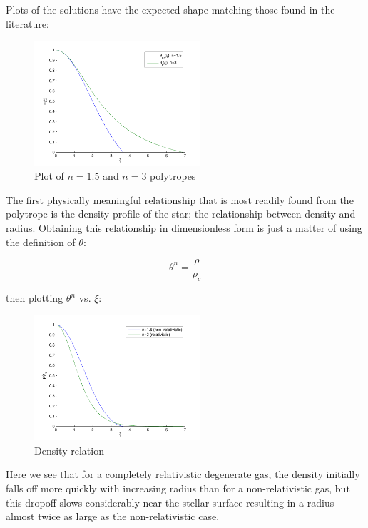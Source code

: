 \documentclass[twoside]{article}
\begin{document}
\begin{multicols}{2}
Plots of the solutions have the expected shape matching those found in the
literature\cite{hansen2004}\cite{leblanc2010}\cite{jardetsky1958}:

\begin{figure}[H]
    \caption{Plot of \(n=1.5\) and \(n=3\) polytropes}
    \includegraphics[width=0.55\textwidth]{lesolution.pdf}
\end{figure}

The first physically meaningful relationship that is most readily found from the
polytrope is the density profile of the star; the relationship between density
and radius. Obtaining this relationship in dimensionless form is just a matter
of using the definition of \(\theta\):

    \begin{equation}
        \theta^n=\frac{\rho}{\rho_c}
    \end{equation}

then plotting \(\theta^n\) vs. \(\xi\):

\begin{figure}[H]
    \caption{Density relation}
    \includegraphics[width=0.55\textwidth]{density.pdf}
\end{figure}

Here we see that for a completely relativistic degenerate gas, the density
initially falls off more quickly with increasing radius than for a
non-relativistic gas, but this dropoff slows considerably near the stellar
surface resulting in a radius almost twice as large as the non-relativistic
case.



\end{multicols}
\end{document}
